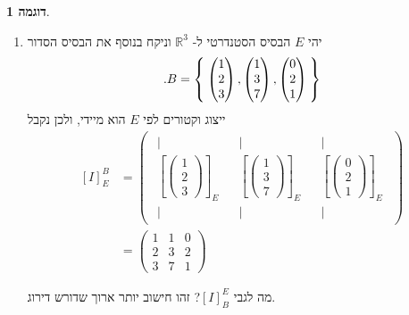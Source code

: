 \documentclass[12pt]{report}
\theoremstyle{plain}
\theoremstyle{definition}
\newtheorem{example}{דוגמה}[chapter]
\newcommand{\R}{\mathbb{R}}
\newcommand{\0}{\mathbf{0}}
\begin{document}
\begin{example}
\begin{enumerate}[label=\alph*.]
\item 
יהי
$E$
הבסיס הסטנדרטי ל-
$\R^3$
וניקח בנוסף את הבסיס הסדור
$$
.B=\Set{\begin{pmatrix}1\\2\\3\end{pmatrix},\begin{pmatrix}1\\3\\7\end{pmatrix},\begin{pmatrix}0\\2\\1\end{pmatrix}}
$$
ייצוג וקטורים לפי 
$E$
הוא מיידי, ולכן נקבל
$$
\begin{aligned}
[I]_E^B&=\begin{pmatrix}
\begin{array}{c}
|\\[-0.4ex]
\left[\begin{pmatrix}1\\2\\3\end{pmatrix}\right]_E\\[-0.4ex]
|
\end{array}
&
\begin{array}{c}
|\\[-0.4ex]
\left[\begin{pmatrix}1\\3\\7\end{pmatrix}\right]_E\\[-0.4ex]
|
\end{array}
&
\begin{array}{c}
|\\[-0.4ex]
\left[\begin{pmatrix}0\\2\\1\end{pmatrix}\right]_E\\[-0.4ex]
|
\end{array}
\end{pmatrix} \\
&=\begin{pmatrix}
1 & 1 & 0 \\
2 & 3 & 2 \\
3 & 7 & 1 
\end{pmatrix}
\end{aligned}
$$

מה לגבי
$[I]_B^E$?
זהו חישוב יותר ארוך שדורש דירוג.


\end{enumerate}
\end{example}
\end{document}
